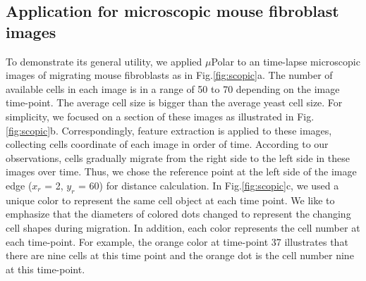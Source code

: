 \documentclass[conference]{IEEEtran}
\begin{document}
\subsection{Application for microscopic mouse fibroblast images}
 To demonstrate its general utility, we applied $\mu$Polar to an time-lapse microscopic images of  migrating mouse fibroblasts as in Fig.\ref{fig:scopic}a. The number of available cells in each image is in a range of 50 to 70 depending on the image time-point. The average cell size is bigger than the average yeast cell size. For simplicity, we focused on a section of these images as illustrated in Fig.\ref{fig:scopic}b. Correspondingly, feature extraction is applied to these images, collecting cells coordinate of each image in order of time. According to our observations, cells gradually migrate from the right side to the left side in these images over time. Thus, we chose the reference point at the left side of the image edge ($x_r$ = 2, $y_r$ = 60) for distance calculation. In Fig.\ref{fig:scopic}c, we used a unique color to represent the same cell object at each time point. We like to emphasize that the diameters of colored dots changed to represent the changing cell shapes during migration. In addition, each color represents the cell number at each time-point. For example, the orange color at time-point 37 illustrates that there are nine cells at this time point and the orange dot is the cell number nine at this time-point. 
\end{document}
